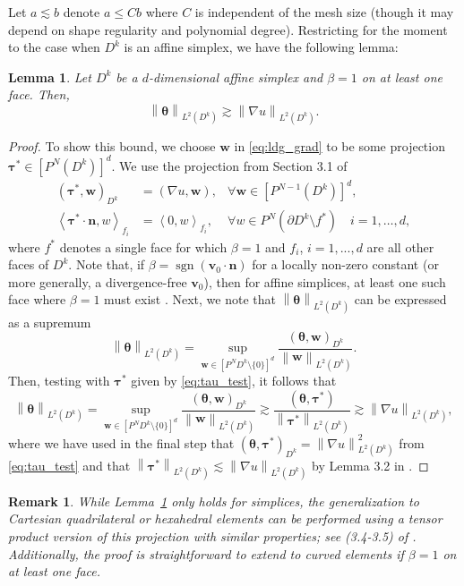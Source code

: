 \documentclass{elsarticle}
\theoremstyle{definition}
\theoremstyle{plain}
\newtheorem{lemma}{Lemma}
\theoremstyle{plain}
\newcommand{\nor}[1]{\left\| #1 \right\|} %
\newcommand{\LRp}[1]{\left( #1 \right)} %
\newcommand{\LRs}[1]{\left[ #1 \right]} %
\newcommand{\LRa}[1]{\left\langle #1 \right\rangle} %
\DeclareMathOperator{\sgn}{sgn}
\newcommand{\refone}[1]{{\color{red}#1}}
\newcommand{\reftwo}[1]{{\color{blue}#1}}
\renewcommand{\refone}[1]{#1}
\renewcommand{\reftwo}[1]{#1}
\newtheorem{remark}{Remark}
\begin{document}
Let $a \lesssim b$ denote $a \leq C b$ where $C$ is independent of the mesh size (though it may depend on shape regularity and polynomial degree). Restricting for the moment to the case when $D^k$ is an affine simplex, we have the following lemma: 
\begin{lemma}
\label{lemma:ldg}
Let $D^k$ be a $d$-dimensional affine simplex and $\beta = 1$ on at least one face. Then,
\[
\nor{\bm{\theta}}_{L^2(D^k)} \gtrsim \nor{\nabla u}_{L^2(D^k)}.
\]
\end{lemma}
\begin{proof}
To show this bound, we choose $\bm{w}$ in \eqref{eq:ldg_grad} to be some projection \reftwo{$\bm{\tau}^* \in \LRs{P^N(D^k)}^d$}. 
We use the projection from Section 3.1 of \cite{cockburn2007analysis} 
\begin{align}
\LRp{\bm{\tau}^*, \bm{w}}_{D^k} &= \LRp{\nabla u, \bm{w}}, &\forall \bm{w} \in \LRs{P^{N-1}(D^k)}^d, \label{eq:tau_test}\\
\LRa{\bm{\tau}^* \cdot\bm{n}, {w}}_{\reftwo{f_i}} &= \LRa{0, w}_{\reftwo{f_i}},  &\forall w \in P^{N}(\partial D^k \setminus f^*) \quad i = 1, \ldots, \reftwo{d} \nonumber \refone{,}
\end{align}
where $f^*$ denotes a single face for which $\beta = 1$ \reftwo{and $f_i$, $i = 1,...,d$ are all other faces of $D^k$}. Note that, if $\beta = \refone{\sgn{(\bm{v}_0\cdot \bm{n})}}$ for a locally \reftwo{non-zero} constant (or more generally, a divergence-free $\bm{v}_0$), then for affine simplices, at least one such face where $\beta = 1$ must exist \cite{cockburn2007analysis}. Next, we note that $\nor{\bm{\theta}}_{L^2(D^k)}$ can be expressed as a supremum \cite{john2016stable}
\[
\nor{\bm{\theta}}_{L^2(D^k)} = \sup_{\reftwo{\bm{w} \in \LRs{P^N{D^k} \setminus \{0\}}^d}} \frac{\LRp{\bm{\theta}, \bm{w}}_{D^k}}{\nor{\bm{w}}_{L^2(D^k)}}.
\]
Then, testing with $\bm{\tau}^*$ given by \eqref{eq:tau_test}, it follows that
\[
\nor{\bm{\theta}}_{L^2(D^k)} = \sup_{\reftwo{\bm{w} \in \LRs{P^N{D^k} \setminus \{0\}}^d}} \frac{\LRp{\bm{\theta}, \bm{w}}_{D^k}}{\nor{\bm{w}}_{L^2(D^k)}} \gtrsim \frac{\LRp{\bm{\theta}, \bm{\tau}^*}}{\nor{\bm{\tau}^*}_{L^2(D^k)}} \gtrsim \nor{\nabla u}_{L^2(D^k)},
\]
where we have used in the final step that $\LRp{\bm{\theta},\bm{\tau}^*}_{D^k} = \nor{\nabla u}_{L^2(D^k)}^2$ from \eqref{eq:tau_test} and that $\nor{\bm{\tau}^*}_{L^2(D^k)} \lesssim \nor{\nabla u}_{L^2(D^k)}$ by Lemma 3.2 in \cite{cockburn2007analysis}.
\end{proof}


\begin{remark}
While Lemma~\ref{lemma:ldg} only holds for simplices, the generalization to Cartesian quadrilateral or hexahedral elements can be performed using a tensor product version of this projection with similar properties; see (3.4-3.5) of \cite{cockburn2001superconvergence}. 
Additionally, the proof is straightforward to extend to curved elements if $\beta = 1$ on at least one face. 
\end{remark}
\end{document}

